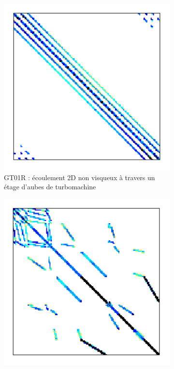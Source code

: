 	\begin{figure}
		\centering
		\begin{subfigure}[t]{0.3\textwidth}
			\centering
			\includegraphics[width=\textwidth]{images/GT01R.png}
			\caption{GT01R : écoulement 2D non visqueux à travers un étage d'aubes de turbomachine}
			\label{fig:sparse.GT01R}
		\end{subfigure}
		\hfill
		\begin{subfigure}[t]{0.3\textwidth}
			\centering
			\includegraphics[width=\textwidth]{images/HV15R.png}

\end{subfigure}
\end{figure}
